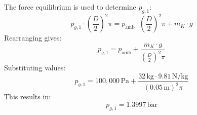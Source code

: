 The force equilibrium is used to determine \( p_{g,1} \):  
\[
p_{g,1} \cdot \left(\frac{D}{2}\right)^2 \pi = p_{\text{amb}} \cdot \left(\frac{D}{2}\right)^2 \pi + m_K \cdot g
\]  
Rearranging gives:  
\[
p_{g,1} = p_{\text{amb}} + \frac{m_K \cdot g}{\left(\frac{D}{2}\right)^2 \pi}
\]  
Substituting values:  
\[
p_{g,1} = 100{,}000 \, \text{Pa} + \frac{32 \, \text{kg} \cdot 9.81 \, \text{N/kg}}{\left(0.05 \, \text{m}\right)^2 \pi}
\]  
This results in:  
\[
p_{g,1} = 1.3997 \, \text{bar}
\]